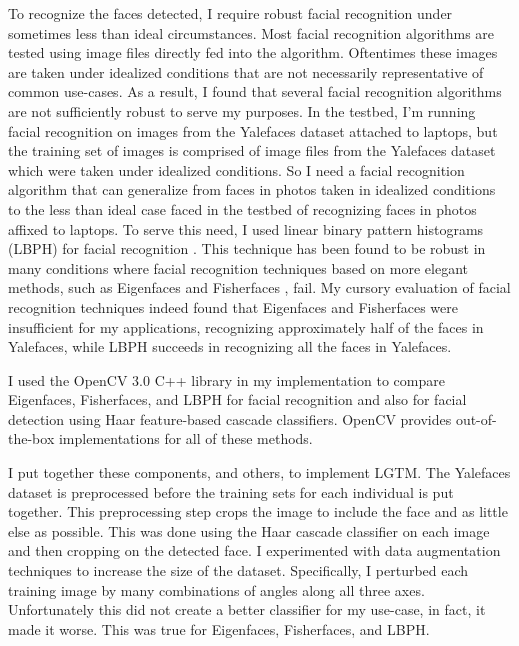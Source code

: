 \documentclass[12pt]{report}
\begin{document}
To recognize the faces detected, I require robust facial recognition under sometimes less than ideal circumstances. Most facial recognition algorithms are tested using image files directly fed into the algorithm. Oftentimes these images are taken under idealized conditions that are not necessarily representative of common use-cases. As a result, I found that several facial recognition algorithms are not sufficiently robust to serve my purposes. In the testbed, I'm running facial recognition on images from the Yalefaces dataset attached to laptops, but the training set of images is comprised of image files from the Yalefaces \cite{FisherfacesBelhumeur1997} dataset which were taken under idealized conditions. So I need a facial recognition algorithm that can generalize from faces in photos taken in idealized conditions to the less than ideal case faced in the testbed of recognizing faces in photos affixed to laptops. To serve this need, I used linear binary pattern histograms (LBPH) for facial recognition \cite{LBPHAhonen2004,LearningMultiScalBlockLBPHLiao2007}. This technique has been found to be robust in many conditions where facial recognition techniques based on more elegant methods, such as Eigenfaces \cite{EigenfacesTurk1991} and Fisherfaces \cite{FisherfacesBelhumeur1997}, fail. My cursory evaluation of facial recognition techniques indeed found that Eigenfaces and Fisherfaces were insufficient for my applications, recognizing approximately half of the faces in Yalefaces, while LBPH succeeds in recognizing all the faces in Yalefaces. \par

I used the OpenCV 3.0 \cite{OpenCV} C++ library in my implementation to compare Eigenfaces, Fisherfaces, and LBPH for facial recognition and also for facial detection using Haar feature-based cascade classifiers. OpenCV provides out-of-the-box implementations for all of these methods. \par

I put together these components, and others, to implement LGTM. The Yalefaces dataset is preprocessed before the training sets for each individual is put together. This preprocessing step crops the image to include the face and as little else as possible. This was done using the Haar cascade classifier on each image and then cropping on the detected face. I experimented with data augmentation techniques to increase the size of the dataset. Specifically, I perturbed each training image by many combinations of angles along all three axes. Unfortunately this did not create a better classifier for my use-case, in fact, it made it worse. This was true for Eigenfaces, Fisherfaces, and LBPH. \par
\end{document}
